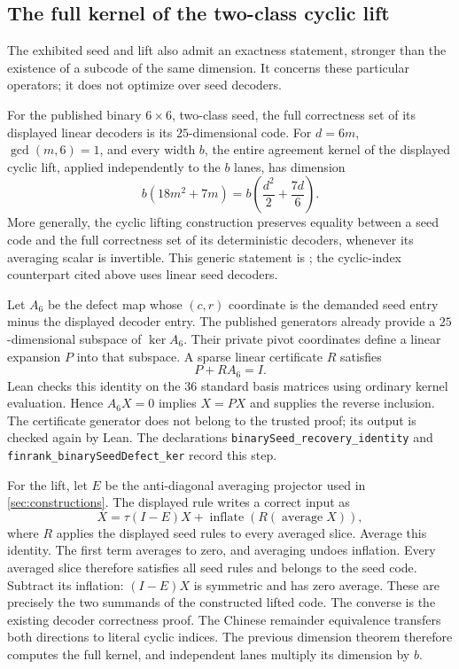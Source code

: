 \subsection{The full kernel of the two-class cyclic lift}

The exhibited seed and lift also admit an exactness statement, stronger
than the existence of a subcode of the same dimension. It concerns these
particular operators; it does not optimize over seed decoders.

\begin{theorem}\label{thm:exact-lift-kernel}
For the published binary $6\times6$, two-class seed, the full
correctness set of its displayed linear decoders is its $25$-dimensional
code. For $d=6m$, $\gcd(m,6)=1$, and every width $b$, the entire agreement
kernel of the displayed cyclic lift, applied independently to the $b$
lanes, has dimension
\[
 b(18m^2+7m)=b\left(\frac{d^2}{2}+\frac{7d}{6}\right).
\]
More generally, the cyclic lifting construction preserves equality between
a seed code and the full correctness set of its deterministic decoders,
whenever its averaging scalar is invertible. This generic statement is
; the cyclic-index counterpart cited above
uses linear seed decoders.
\end{theorem}

\begin{outline}
Let $A_6$ be the defect map whose $(c,r)$ coordinate is the demanded seed
entry minus the displayed decoder entry. The published generators already
provide a $25$-dimensional subspace of $\ker A_6$. Their private pivot
coordinates define a linear expansion $P$ into that subspace. A sparse
linear certificate $R$ satisfies
\[
 P+RA_6=I.
\]
Lean checks this identity on the $36$ standard basis matrices using
ordinary kernel evaluation. Hence $A_6X=0$ implies $X=PX$ and supplies the
reverse inclusion. The certificate generator does not belong to the
trusted proof; its output is checked again by Lean. The declarations
\texttt{binarySeed\_recovery\_identity} and
\texttt{finrank\_binarySeedDefect\_ker} record this step.

For the lift, let $E$ be the anti-diagonal averaging projector used in
\cref{sec:constructions}. The displayed rule writes a correct input as
\[
 X=\tau(I-E)X+\operatorname{inflate}(R(\operatorname{average}X)),
\]
where $R$ applies the displayed seed rules to every averaged slice.
Average this identity. The first term averages to zero, and averaging
undoes inflation. Every averaged slice therefore satisfies all seed
rules and belongs to the seed code. Subtract its inflation: $(I-E)X$
is symmetric and has zero average. These are precisely the two summands
of the constructed lifted code. The converse is the existing decoder
correctness proof. The Chinese remainder equivalence transfers both
directions to literal cyclic indices. The previous dimension theorem
therefore computes the full kernel, and independent lanes multiply its
dimension by $b$.
\end{outline}

